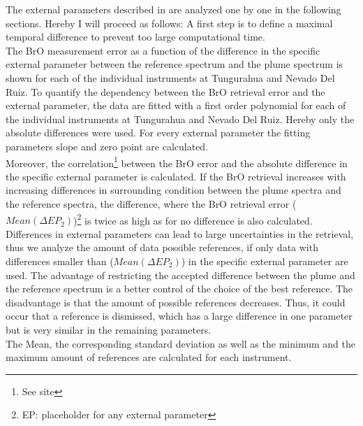The external parameters described in  are analyzed one by one in the following sections. Hereby I will proceed as follows:
A first step is to define a maximal temporal difference to prevent too large computational time.\\
The BrO measurement error as a function of the difference in the specific external parameter between the reference spectrum and the plume spectrum is shown for each of the individual instruments at Tungurahua and Nevado Del Ruiz. 
To quantify the dependency between the BrO retrieval error and the external parameter, the data are fitted with a first order polynomial for each of the individual instruments at Tungurahua and Nevado Del Ruiz. Hereby only the absolute differences were used. For every external parameter the fitting parameters slope and zero point are calculated.\\
Moreover, the correlation\footnote{See site \pageref{ff}}  between the BrO error and the absolute difference in the specific external parameter is calculated. If the BrO retrieval increases with increasing differences in surrounding condition between the plume spectra and the reference spectra, the difference, where the BrO retrieval error ($Mean(\Delta EP_{2})$)\footnote{EP: placeholder for any external parameter} is twice as high as for no difference is also calculated.\\  
Differences in external parameters can lead to large uncertainties in the retrieval, thus we analyze the amount of data possible references, if only data with differences smaller than ($Mean(\Delta EP_{2})$) in the specific external parameter are used. 
The advantage of restricting the accepted difference between the plume and the reference spectrum is a better control of the choice of the best reference. The disadvantage is that the amount of possible references decreases. Thus, it could occur that a reference is dismissed, which has a large difference in one parameter but is very similar in the remaining parameters.\\
The Mean, the corresponding standard deviation as well as the minimum and the maximum amount of references are calculated for each instrument.

